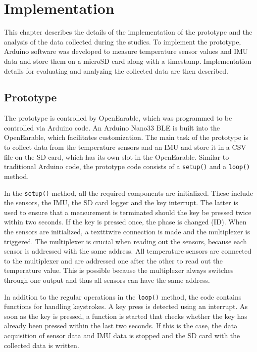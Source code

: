 \chapter{Implementation}
\label{ch:Implementation}
This chapter describes the details of the implementation of the prototype and the analysis of the data collected during the studies.
To implement the prototype, Arduino software was developed to measure temperature sensor values and IMU data and store them on a microSD card along with a timestamp.
Implementation details for evaluating and analyzing the collected data are then described.

\section{Prototype}
The prototype is controlled by OpenEarable, which was programmed to be controlled via Arduino code. 
An Arduino Nano33 BLE is built into the OpenEarable, which facilitates customization. 
The main task of the prototype is to collect data from the temperature sensors and an IMU and store it in a CSV file on the SD card, which has its own slot in the OpenEarable. 
Similar to traditional Arduino code, the prototype code consists of a \texttt{setup()} and a \texttt{loop()} method.

In the \texttt{setup()} method, all the required components are initialized. These include the sensors, the IMU, the SD card logger and the key interrupt. The latter is used to ensure that a measurement is terminated should the key be pressed twice within two seconds. If the key is pressed once, the phase is changed (ID). 
When the sensors are initialized, a texttt{wire} connection is made and the multiplexer is triggered.
The multiplexer is crucial when reading out the sensors, because each sensor is addressed with the same address.
All temperature sensors are connected to the multiplexer and are addressed one after the other to read out the temperature value.
This is possible because the multiplexer always switches through one output and thus all sensors can have the same address.

In addition to the regular operations in the \texttt{loop()} method, the code contains functions for handling keystrokes. A key press is detected using an interrupt. As soon as the key is pressed, a function is started that checks whether the key has already been pressed within the last two seconds. If this is the case, the data acquisition of sensor data and IMU data is stopped and the SD card with the collected data is written.

